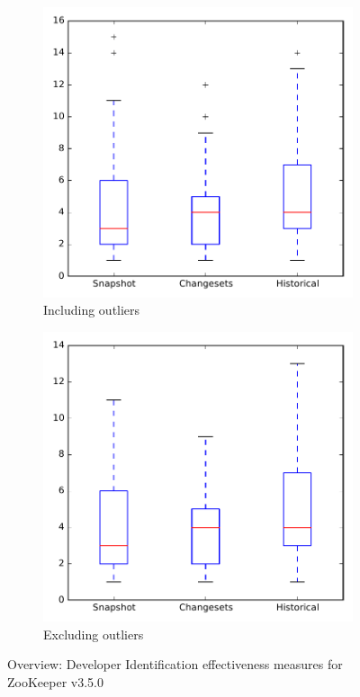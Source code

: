 
\begin{figure}
    \centering
    \begin{subfigure}{.4\textwidth}
        \centering
        \includegraphics[height=0.4\textheight]{figures/dit/all_zookeeper}
        \caption{Including outliers}\label{fig:dit:all:zookeeper_outlier}
    \end{subfigure}%
    \begin{subfigure}{.4\textwidth}
        \centering
        \includegraphics[height=0.4\textheight]{figures/dit/all_zookeeper_no_outlier}
        \caption{Excluding outliers}\label{fig:dit:all:zookeeper_no_outlier}
    \end{subfigure}
\caption{Overview: Developer Identification effectiveness measures for ZooKeeper v3.5.0}
\label{fig:dit:all:zookeeper}
\end{figure}
